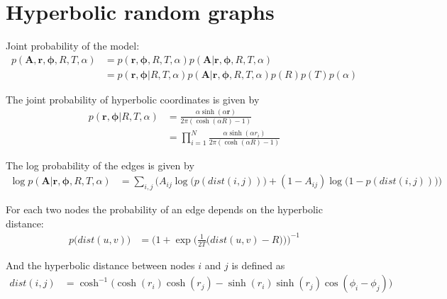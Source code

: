 \documentclass{article}
\renewcommand{\v}[1]{\bm{#1}}
\begin{document}
\section{Hyperbolic random graphs}

Joint probability of the model:
\begin{equation}
\begin{split}
p(\v{A}, \v{r}, \v{\phi}, R,T,\alpha)
&= p(\v{r}, \v{\phi}, R,T,\alpha) p(\v{A} | \v{r}, \v{\phi}, R,T,\alpha)\\
&= p(\v{r}, \v{\phi} | R,T,\alpha) p(\v{A} | \v{r}, \v{\phi}, R,T,\alpha) p(R) p(T) p(\alpha)
\end{split}
\end{equation}

The joint probability of hyperbolic coordinates is given by
\begin{equation}
\begin{split}
p(\v{r}, \v{\phi} | R,T,\alpha) &= \frac{\alpha \sinh (\alpha \v{r})}{2 \pi (\cosh (\alpha R) -1)}\\
&= \prod_{i=1}^{N} \frac{\alpha \sinh (\alpha r_i)}{2 \pi (\cosh (\alpha R) -1)}
\end{split}
\end{equation}

The log probability of the edges is given by
\begin{equation}
\begin{split}
\log p(\v{A} | \v{r}, \v{\phi}, R,T,\alpha) 
&= \sum_{i,j} \biggl( A_{ij} \log \bigl(p(dist(i,j))\bigr) + (1-A_{ij}) \log \bigl(1 - p(dist(i,j))\bigr) \biggr)
\end{split}
\end{equation}

For each two nodes the probability of an edge depends on the hyperbolic distance:
\begin{equation}
\begin{split}
p \bigl(dist(u,v) \bigr)
&= \Biggl( 1 + \exp \biggl(\frac{1}{2T} \bigl(dist(u,v)-R \bigr)\biggr) \Biggr)^{-1}
\end{split}
\end{equation}

And the hyperbolic distance between nodes $i$ and $j$ is defined as
\begin{equation}
\begin{split}
dist(i,j) 
&= \cosh^{-1} \bigl( \cosh(r_i) \cosh(r_j) - \sinh(r_i) \sinh(r_j) \cos(\phi_i - \phi_j)\bigr)
\end{split}
\end{equation}
\end{document}
